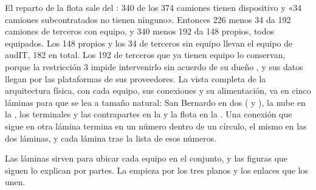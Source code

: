 El reparto de la flota sale del : 340 de los 374 camiones tienen dispositivo y
«34 camiones subcontratados no tienen ninguno». Entonces 226 menos 34 da 192 camiones de terceros con
equipo, y 340 menos 192 da 148 propios, todos equipados. Los 148 propios y los 34 de terceros sin
equipo llevan el equipo de audIT, 182 en total. Los 192 de terceros que ya tienen equipo lo conservan,
porque la restricción 3 impide intervenirlo sin acuerdo de su dueño , y sus
datos llegan por las plataformas de sus proveedores. La vista completa de la arquitectura física, con
cada equipo, sus conexiones y su alimentación, va en cinco láminas para que se lea a tamaño natural:
San Bernardo en dos ( y ), la nube en la , los
terminales y las contrapartes en la  y la flota en la . Una
conexión que sigue en otra lámina termina en un número dentro de un círculo, el mismo en las dos
láminas, y cada lámina trae la lista de esos números.






Las láminas sirven para ubicar cada equipo en el conjunto, y las figuras que siguen lo explican por
partes. La  empieza por los tres planos y los enlaces que los unen.



